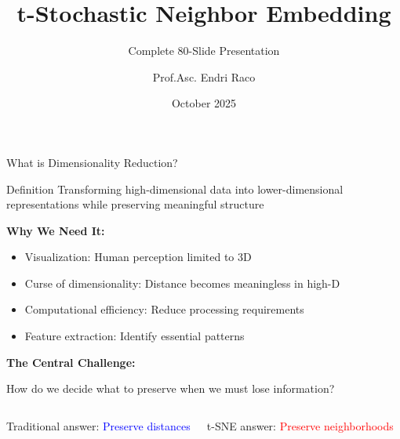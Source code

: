 \documentclass[aspectratio=169]{beamer}
\title{t-Stochastic Neighbor Embedding}
\subtitle{Complete 80-Slide Presentation}
\author{Prof.Asc. Endri Raco}
\institute{Polytechnic University of Tirane}
\date{October 2025}
\begin{document}

\begin{frame}
\titlepage
\end{frame}

\begin{frame}{What is Dimensionality Reduction?}
\begin{block}{Definition}
Transforming high-dimensional data into lower-dimensional representations while preserving meaningful structure
\end{block}

\textbf{Why We Need It:}
\begin{itemize}
\item Visualization: Human perception limited to 3D
\item Curse of dimensionality: Distance becomes meaningless in high-D
\item Computational efficiency: Reduce processing requirements
\item Feature extraction: Identify essential patterns
\end{itemize}

\textbf{The Central Challenge:}
\begin{center}
\Large How do we decide what to preserve when we must lose information?
\end{center}

\begin{columns}
\centering
Traditional answer: \textcolor{blue}{Preserve distances}

\centering
t-SNE answer: \textcolor{red}{Preserve neighborhoods}
\end{columns}
\end{frame}
\end{document}
